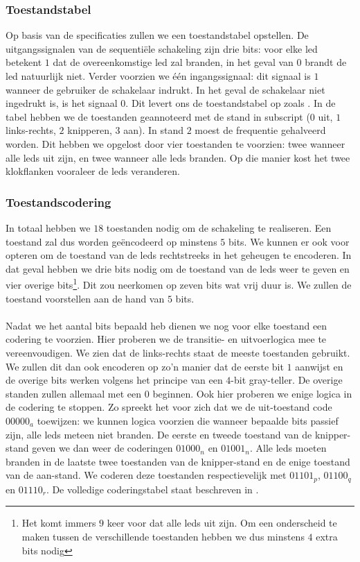\subsubsection{Toestandstabel}
Op basis van de specificaties zullen we een toestandstabel opstellen. De uitgangssignalen van de sequenti\"ele schakeling zijn drie bits: voor elke led betekent $1$ dat de overeenkomstige led zal branden, in het geval van $0$ brandt de led natuurlijk niet. Verder voorzien we \'e\'en ingangssignaal: dit signaal is $1$ wanneer de gebruiker de schakelaar indrukt. In het geval de schakelaar niet ingedrukt is, is het signaal $0$. Dit levert ons de toestandstabel op zoals .
In de tabel hebben we de toestanden geannoteerd met de stand in subscript ($0$ uit, $1$ links-rechts, $2$ knipperen, $3$ aan). In stand $2$ moest de frequentie gehalveerd worden. Dit hebben we opgelost door vier toestanden te voorzien: twee wanneer alle leds uit zijn, en twee wanneer alle leds branden. Op die manier kost het twee klokflanken vooraleer de leds veranderen.
\subsubsection{Toestandscodering}
In totaal hebben we $18$ toestanden nodig om de schakeling te realiseren. Een toestand zal dus worden ge\"encodeerd op minstens $5$ bits. We kunnen er ook voor opteren om de toestand van de leds rechtstreeks in het geheugen te encoderen. In dat geval hebben we drie bits nodig om de toestand van de leds weer te geven en vier overige bits\footnote{Het komt immers $9$ keer voor dat alle leds uit zijn. Om een onderscheid te maken tussen de verschillende toestanden hebben we dus minstens $4$ extra bits nodig}. Dit zou neerkomen op zeven bits wat vrij duur is. We zullen de toestand voorstellen aan de hand van $5$ bits.
\paragraph{}
Nadat we het aantal bits bepaald heb dienen we nog voor elke toestand een codering te voorzien. Hier proberen we de transitie- en uitvoerlogica mee te vereenvoudigen. We zien dat de links-rechts staat de meeste toestanden gebruikt. We zullen dit dan ook encoderen op zo'n manier dat de eerste bit $1$ aanwijst en de overige bits werken volgens het principe van een $4$-bit gray-teller. De overige standen zullen allemaal met een $0$ beginnen. Ook hier proberen we enige logica in de codering te stoppen. Zo spreekt het voor zich dat we de uit-toestand code $00000_a$ toewijzen: we kunnen logica voorzien die wanneer bepaalde bits passief zijn, alle leds meteen niet branden. De eerste en tweede toestand van de knipper-stand geven we dan weer de coderingen $01000_n$ en $01001_n$. Alle leds moeten branden in de laatste twee toestanden van de knipper-stand en de enige toestand van de aan-stand. We coderen deze toestanden respectievelijk met $01101_p$, $01100_q$ en $01110_r$. De volledige coderingstabel staat beschreven in .
